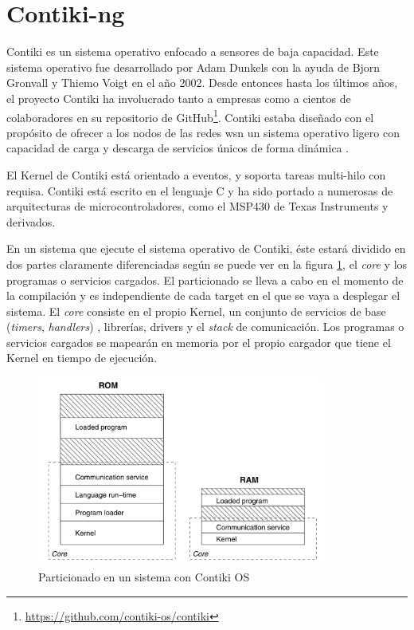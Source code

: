 \section{Contiki-ng}
\label{sec:contikiNG}

Contiki es un sistema operativo enfocado a sensores de baja capacidad. Este sistema operativo fue desarrollado por Adam Dunkels con la ayuda de  Bjorn Gronvall y Thiemo Voigt en el año 2002. Desde entonces hasta los últimos años, el proyecto Contiki  ha involucrado tanto a empresas como a cientos de colaboradores en su repositorio de GitHub\footnote{\url{https://github.com/contiki-os/contiki}}.  Contiki estaba diseñado con el propósito de ofrecer a los nodos de las redes \gls{wsn} un sistema operativo ligero con capacidad de carga y descarga de servicios únicos de forma dinámica \cite{1367266}. \\
\par
El Kernel de Contiki está orientado a eventos, y soporta tareas multi-hilo con requisa. Contiki está escrito en el lenguaje C y ha sido portado a numerosas de arquitecturas de microcontroladores, como el MSP430 de Texas Instruments y derivados. \\
\par

En un sistema que ejecute el sistema operativo de Contiki, éste estará dividido en dos partes claramente diferenciadas según se puede ver en la figura \ref{fig:contikiParts}, el \textit{core} y los programas o servicios cargados. El particionado se lleva a cabo en el momento de la compilación y es independiente de cada target en el que se vaya a desplegar el sistema. El \textit{core} consiste en el propio Kernel, un conjunto de servicios de base (\textit{timers}, \textit{handlers}) , librerías, drivers y el \textit{stack} de comunicación. Los programas o servicios cargados se mapearán en memoria por el propio cargador que tiene el Kernel en tiempo de ejecución.\\
\par


\begin{figure}[ht]
    \centering
    \includegraphics[width=9.5cm]{archivos/img/teoria/contiki.png}
    \caption{Particionado en un sistema con Contiki OS \cite{1367266}}
    \label{fig:contikiParts}
\end{figure}

